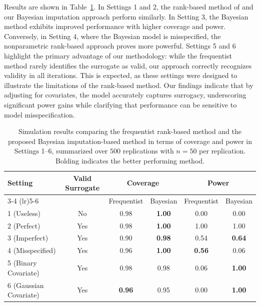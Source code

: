 \documentclass[referee,usenatbib]{biom}
\begin{document}
Results are shown in Table~\ref{tab:coverage_power_comparison}. In Settings 1 and 2, the rank-based method of \citet{parast2024rank} and our Bayesian imputation approach perform similarly. In Setting 3, the Bayesian method exhibits improved performance with higher coverage and power. Conversely, in Setting 4, where the Bayesian model is misspecified, the nonparametric rank-based approach proves more powerful. Settings 5 and 6 highlight the primary advantage of our methodology: while the frequentist method rarely identifies the surrogate as valid, our approach correctly recognizes validity in all iterations. This is expected, as these settings were designed to illustrate the limitations of the rank-based method. Our findings indicate that by adjusting for covariates, the model accurately captures surrogacy, underscoring significant power gains while clarifying that performance can be sensitive to model misspecification.

\begin{table}[htbp]
\caption{Simulation results comparing the frequentist rank-based method and the proposed Bayesian imputation-based method in terms of coverage and power in Settings 1--6, summarized over \(500\) replications with \(n=50\) per replication. Bolding indicates the better performing method.}
\label{tab:coverage_power_comparison}
\begin{tabular}{lccccc}
\toprule
\textbf{Setting} & \textbf{Valid Surrogate} & \multicolumn{2}{c}{\textbf{Coverage}} & \multicolumn{2}{c}{\textbf{Power}} \\
\cmidrule(lr){3-4} \cmidrule(lr){5-6}
& & Frequentist & Bayesian & Frequentist & Bayesian \\
\midrule
1 (Useless)            & No  & 0.98   & \textbf{1.00}  & 0.00          & 0.00  \\
2 (Perfect)            & Yes & 0.98   & \textbf{1.00}  & 1.00          & 1.00  \\
3 (Imperfect)          & Yes & 0.90   & \textbf{0.98}  & 0.54          & \textbf{0.64} \\
4 (Misspecified)       & Yes & 0.96   & \textbf{1.00}  & \textbf{0.56} & 0.06  \\
5 (Binary Covariate)   & Yes & 0.98           & 0.98           & 0.06          & \textbf{1.00} \\
6 (Gaussian Covariate) & Yes & \textbf{0.96}  & 0.95           & 0.00          & \textbf{1.00} \\
\bottomrule
\end{tabular}
\end{table}
\end{document}

